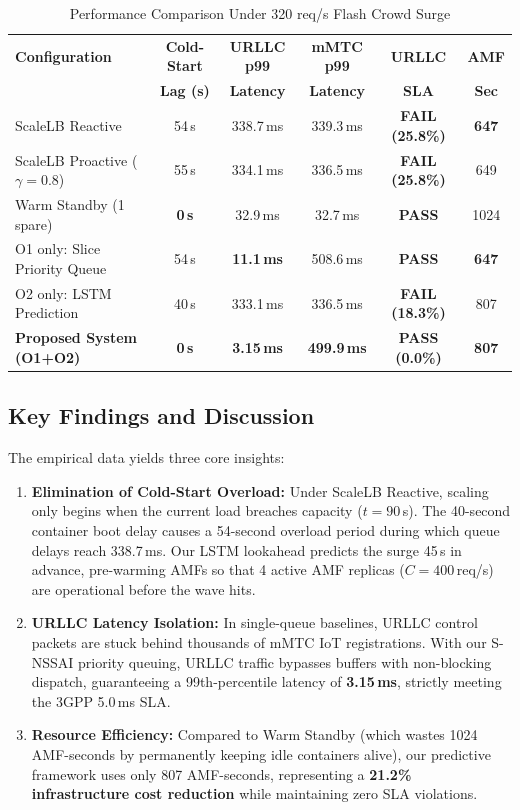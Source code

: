 \documentclass[conference]{IEEEtran}
\begin{document}
\begin{table}[htbp]
\caption{Performance Comparison Under 320 req/s Flash Crowd Surge}
\label{tab:results_table}
\centering
\begin{tabular}{lccccc}
\toprule
\textbf{Configuration} & \textbf{Cold-Start} & \textbf{URLLC p99} & \textbf{mMTC p99} & \textbf{URLLC} & \textbf{AMF} \\
 & \textbf{Lag (s)} & \textbf{Latency} & \textbf{Latency} & \textbf{SLA} & \textbf{Sec} \\
\midrule
ScaleLB Reactive \cite{scalelb} & 54\,s & 338.7\,ms & 339.3\,ms & \textbf{FAIL (25.8\%)} & \textbf{647} \\
ScaleLB Proactive ($\gamma=0.8$) & 55\,s & 334.1\,ms & 336.5\,ms & \textbf{FAIL (25.8\%)} & 649 \\
Warm Standby (1 spare) & \textbf{0\,s} & 32.9\,ms & 32.7\,ms & \textbf{PASS} & 1024 \\
O1 only: Slice Priority Queue & 54\,s & \textbf{11.1\,ms} & 508.6\,ms & \textbf{PASS} & \textbf{647} \\
O2 only: LSTM Prediction & 40\,s & 333.1\,ms & 336.5\,ms & \textbf{FAIL (18.3\%)} & 807 \\
\textbf{Proposed System (O1+O2)} & \textbf{0\,s} & \textbf{3.15\,ms} & \textbf{499.9\,ms} & \textbf{PASS (0.0\%)} & \textbf{807} \\
\bottomrule
\end{tabular}
\end{table}

\subsection{Key Findings and Discussion}
The empirical data yields three core insights:
\begin{enumerate}
    \item \textbf{Elimination of Cold-Start Overload:} Under ScaleLB Reactive, scaling only begins when the current load breaches capacity ($t = 90$\,s). The 40-second container boot delay causes a 54-second overload period during which queue delays reach 338.7\,ms. Our LSTM lookahead predicts the surge 45\,s in advance, pre-warming AMFs so that 4 active AMF replicas ($C = 400$\,req/s) are operational before the wave hits.
    \item \textbf{URLLC Latency Isolation:} In single-queue baselines, URLLC control packets are stuck behind thousands of mMTC IoT registrations. With our S-NSSAI priority queuing, URLLC traffic bypasses buffers with non-blocking dispatch, guaranteeing a 99th-percentile latency of \textbf{3.15\,ms}, strictly meeting the 3GPP 5.0\,ms SLA.
    \item \textbf{Resource Efficiency:} Compared to Warm Standby (which wastes 1024 AMF-seconds by permanently keeping idle containers alive), our predictive framework uses only 807 AMF-seconds, representing a \textbf{21.2\% infrastructure cost reduction} while maintaining zero SLA violations.
\end{enumerate}
\end{document}
